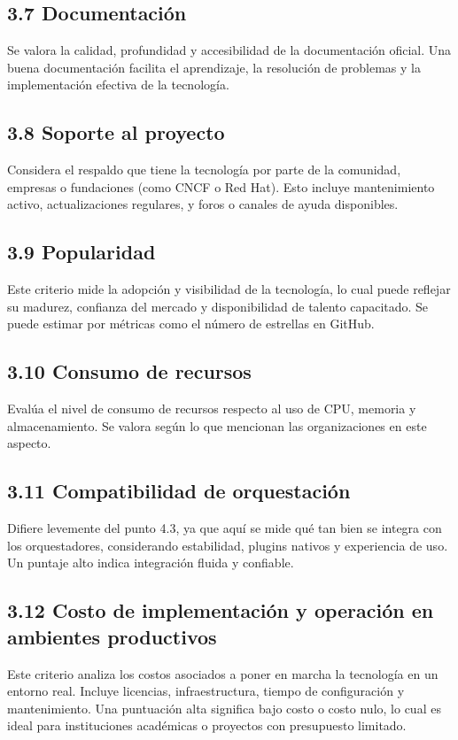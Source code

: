 \subsection*{3.7 Documentación}
Se valora la calidad, profundidad y accesibilidad de la documentación oficial. Una buena documentación facilita el aprendizaje, la resolución de problemas y la implementación efectiva de la tecnología.

\subsection*{3.8 Soporte al proyecto}
Considera el respaldo que tiene la tecnología por parte de la comunidad, empresas o fundaciones (como CNCF o Red Hat). Esto incluye mantenimiento activo, actualizaciones regulares, y foros o canales de ayuda disponibles.

\subsection*{3.9 Popularidad}
Este criterio mide la adopción y visibilidad de la tecnología, lo cual puede reflejar su madurez, confianza del mercado y disponibilidad de talento capacitado. Se puede estimar por métricas como el número de estrellas en GitHub.

\subsection*{3.10 Consumo de recursos}
Evalúa el nivel de consumo de recursos respecto al uso de CPU, memoria y almacenamiento. Se valora según lo que mencionan las organizaciones en este aspecto.

\subsection*{3.11 Compatibilidad de orquestación}
Difiere levemente del punto 4.3, ya que aquí se mide qué tan bien se integra con los orquestadores, considerando estabilidad, plugins nativos y experiencia de uso. Un puntaje alto indica integración fluida y confiable.

\subsection*{3.12 Costo de implementación y operación en ambientes productivos}
Este criterio analiza los costos asociados a poner en marcha la tecnología en un entorno real. Incluye licencias, infraestructura, tiempo de configuración y mantenimiento. Una puntuación alta significa bajo costo o costo nulo, lo cual es ideal para instituciones académicas o proyectos con presupuesto limitado.

